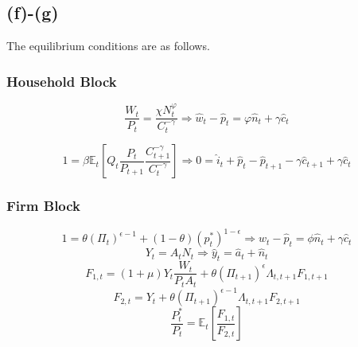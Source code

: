 \documentclass[12pt]{article}
\newcommand{\E}{\mathbb{E}}
\begin{document}
\subsection*{(f)-(g)}

The equilibrium conditions are as follows.

\subsubsection*{Household Block}

\begin{equation}
\label{eq:labor_leisure}
\frac{W_{t}}{P_{t}} = \frac{\chi N^{\varphi}_{t}}{C^{-\gamma}_{t}}
\Rightarrow
\hat{w}_{t} - \hat{p}_{t} = \varphi\hat{n}_{t}+\gamma\hat{c}_{t}
\end{equation}

\begin{equation}
\label{eq:euler}
1 = \beta \E_{t}\left[Q_{t}\frac{P_{t}}{P_{t+1}}\frac{C^{-\gamma}_{t+1}}{C^{-\gamma}_{t}}\right]
\Rightarrow
0=\hat{i}_{t}+\hat{p}_{t}-\hat{p}_{t+1}-\gamma\hat{c}_{t+1}+\gamma\hat{c}_{t}
\end{equation}


\subsubsection*{Firm Block}
\begin{equation}
\label{eq:p_weighted}
1 = \theta\left(\Pi_{t}\right)^{\epsilon-1}+\left(1-\theta\right)\left(p^{\ast}_{t}\right)^{1-\epsilon}
\Rightarrow
\hat{w}_{t}-\hat{p}_{t}=\phi\hat{n}_{t}+\gamma\hat{c}_{t}
\end{equation}
\begin{equation}
\label{eq:output}
Y_{t} = A_{t}N_{t}
\Rightarrow
\hat{y}_{t} = \hat{a}_{t} + \hat{n}_{t}
\end{equation}
\begin{equation}
\label{eq:F_1}
F_{1,t} = \left(1+\mu\right)Y_{t}\frac{W_{t}}{P_{t}A_{t}} + \theta\left(\Pi_{t+1}\right)^{\epsilon}\Lambda_{t,t+1}F_{1,t+1}
\end{equation}
\begin{equation}
\label{eq:F_2}
F_{2,t} = Y_{t} + \theta\left(\Pi_{t+1}\right)^{\epsilon-1}\Lambda_{t,t+1}F_{2,t+1}
\end{equation}
\begin{equation}
\label{eq:sdf}
\frac{P^{\ast}_{t}}{P_{t}} = \E_{t}[\frac{F_{1,t}}{F_{2,t}}]
\end{equation}
\end{document}
